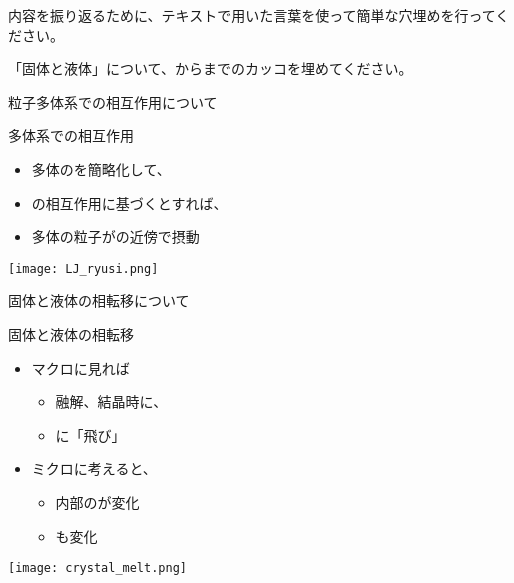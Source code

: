 \documentclass[uplatex,dvipdfmx,a4paper,11pt]{jsarticle}
\begin{document}
\clearpage

内容を振り返るために、テキストで用いた言葉を使って簡単な穴埋めを行ってください。
\begin{qlist}
	\qitem 「固体と液体」について、からまでのカッコを埋めてください。
		\begin{qlist2}
			\qitem 粒子多体系での相互作用について
				\begin{center}
					\begin{minipage}{0.52\textwidth}
						\begin{itembox}[l]{多体系での相互作用}
							\begin{itemize}
								\item 多体の\qbox{}を簡略化して、
								\item \qbox{}の相互作用に基づくとすれば、
								\item 多体の粒子が\qbox{}の近傍で摂動
							\end{itemize}
						\end{itembox}
					\end{minipage}
					\begin{minipage}{0.32\textwidth}
						\begin{center}
						\texttt{[image: LJ\_ryusi.png]}
						\end{center}
					\end{minipage}
			\end{center}

		\qitem 固体と液体の相転移について
			\begin{center}
				\begin{minipage}{0.42\textwidth}
					\begin{itembox}[l]{固体と液体の相転移}
						\begin{itemize}
							\item マクロに見れば
							\begin{itemize}
								\item 融解、結晶時に、
								\item \qbox{}に「飛び」
							\end{itemize}
							\item ミクロに考えると、
							\begin{itemize}
								\item 内部の\qbox{}が変化
								\item \qbox{}も変化
							\end{itemize}
						\end{itemize}
					\end{itembox}
				\end{minipage}
				\begin{minipage}{0.42\textwidth}
					\begin{center}
					\texttt{[image: crystal\_melt.png]}
					\end{center}
				\end{minipage}
			\end{center}
			

\end{qlist2}
\end{qlist}
\end{document}
